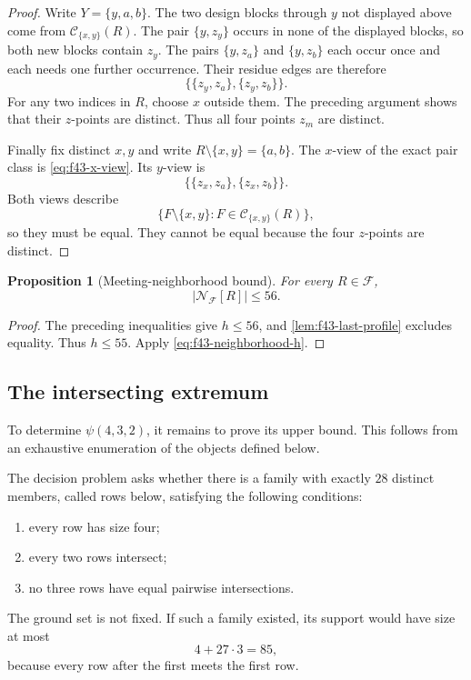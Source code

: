\documentclass[11pt]{article}
\numberwithin{equation}{section}
\newtheorem{proposition}[proposition]{Proposition}
\theoremstyle{definition}
\theoremstyle{remark}
\newcommand{\F}{\mathcal F}
\newcommand{\C}{\mathcal C}
\begin{document}
\begin{proof}
Write $Y=\{y,a,b\}$. The two design blocks through $y$ not displayed above
come from $\C_{\{x,y\}}(R)$. The pair $\{y,z_y\}$ occurs in none of the
displayed blocks, so both new blocks contain $z_y$. The pairs
$\{y,z_a\}$ and $\{y,z_b\}$ each occur once and each needs one further
occurrence. Their residue edges are therefore
\begin{equation}
 \bigl\{\{z_y,z_a\},\{z_y,z_b\}\bigr\}.
 \label{eq:f43-x-view}
\end{equation}
For any two indices in $R$, choose $x$ outside them. The preceding argument
shows that their $z$-points are distinct. Thus all four points $z_m$ are
distinct.

Finally fix distinct $x,y$ and write $R\setminus\{x,y\}=\{a,b\}$. The
$x$-view of the exact pair class is \cref{eq:f43-x-view}. Its $y$-view is
\[
 \bigl\{\{z_x,z_a\},\{z_x,z_b\}\bigr\}.
\]
Both views describe
\[
 \{F\setminus\{x,y\}:F\in\C_{\{x,y\}}(R)\},
\]
so they must be equal. They cannot be equal because the four $z$-points are
distinct.
\end{proof}

\begin{proposition}[Meeting-neighborhood bound]
\label{prop:f43-neighborhood}
For every $R\in\F$,
\begin{equation}
 |\mathcal N_{\F}[R]|\le56.
 \label{eq:f43-N56}
\end{equation}
\end{proposition}

\begin{proof}
The preceding inequalities give $h\le56$, and
\cref{lem:f43-last-profile} excludes equality. Thus $h\le55$.
Apply \cref{eq:f43-neighborhood-h}.
\end{proof}

\subsection{The intersecting extremum}

To determine $\psi(4,3,2)$, it remains to prove its upper bound. This follows
from an exhaustive enumeration of the objects defined below.

The decision problem asks whether there is a family with exactly $28$
distinct members, called rows below, satisfying the following conditions:
\begin{enumerate}
\item every row has size four;
\item every two rows intersect;
\item no three rows have equal pairwise intersections.
\end{enumerate}
The ground set is not fixed. If such a family existed, its support would
have size at most
\begin{equation}
 4+27\cdot3=85,
 \label{eq:f43-support85}
\end{equation}
because every row after the first meets the first row.
\end{document}
